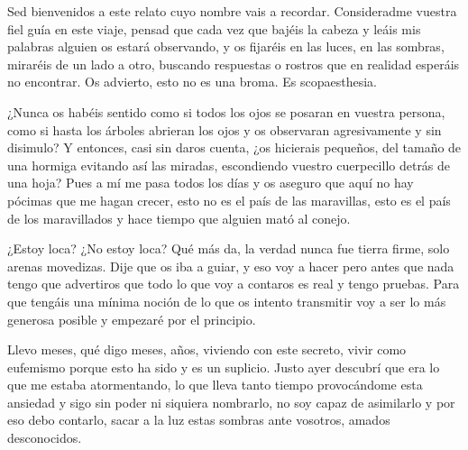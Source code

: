 Sed bienvenidos a este relato cuyo nombre vais a recordar. Consideradme vuestra fiel guía en este viaje, pensad que cada vez que bajéis la cabeza y leáis mis palabras alguien os estará observando, y os fijaréis en las luces, en las sombras, miraréis de un lado a otro, buscando respuestas o rostros que en realidad esperáis no encontrar.  Os advierto, esto no es una broma.  Es scopaesthesia. 

¿Nunca os habéis sentido como si todos los ojos se posaran en vuestra persona, como si hasta los árboles abrieran los ojos y os observaran agresivamente y sin disimulo? Y entonces, casi sin daros cuenta, ¿os hicierais pequeños, del tamaño de una hormiga evitando así las miradas, escondiendo vuestro cuerpecillo detrás de una hoja? Pues a mí me pasa todos los días y os aseguro que aquí no hay pócimas que me hagan crecer, esto no es el país de las maravillas, esto es el país de los maravillados y hace tiempo que alguien mató al conejo. 

¿Estoy loca? ¿No estoy loca? Qué más da, la verdad nunca fue tierra firme, solo arenas movedizas. Dije que os iba a guiar, y eso voy a hacer pero antes que nada tengo que advertiros que todo lo que voy a contaros es real y tengo pruebas.  Para que tengáis una mínima noción de lo que os intento transmitir voy a ser lo más generosa posible y empezaré por el principio. 

Llevo meses, qué digo meses, años, viviendo con este secreto,  vivir como eufemismo porque esto ha sido y es un suplicio. Justo ayer descubrí que era lo que me estaba atormentando, lo que lleva tanto tiempo provocándome esta ansiedad y sigo sin poder ni siquiera nombrarlo, no soy capaz de asimilarlo y por eso debo contarlo, sacar a la luz estas sombras ante vosotros, amados desconocidos.